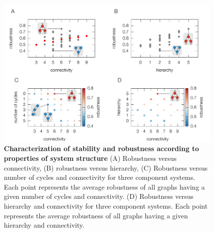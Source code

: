 



\begin{figure}[!ht]
\centering
\noindent\includegraphics[width=1.0\columnwidth]{fig/combinedfigs.pdf}
\caption{{\bf Characterization of stability and robustness according to properties of system structure} (A) Robustness versus connectivity, (B) robustness versus hierarchy, (C) Robustness versus number of cycles and connectivity for three component systems. Each point represents the average robustness of all graphs having a given number of cycles and connectivity. (D) Robustness versus hierarchy and connectivity for three component systems. Each point represents the average robustness of all graphs having a given hierarchy and connectivity.
}
\label{fig:combined}
\end{figure}

